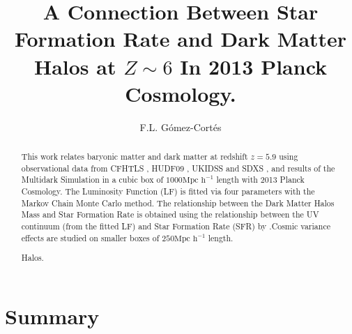 \documentclass[manuscript]{aastex}
\begin{document}
\title{A Connection Between Star Formation Rate and Dark Matter Halos at 
$Z\sim6$ In 2013 Planck Cosmology.}

\author{F.L. G\'omez-Cort\'es }

\begin{abstract}
This work relates baryonic matter and dark matter at redshift $z=5.9$ using 
observational data from CFHTLS \citep{willott13}, HUDF09 
\citep{bouwens06,bouwens12}, UKIDSS and SDXS \citep{mclure09}, and results of 
the Multidark Simulation \citep{riebe13} in a cubic box of $1000 \textrm{Mpc 
h}^{-1}$ length with 2013 Planck Cosmology. The Luminosity Function (LF) is 
fitted via four parameters with the Markov Chain Monte Carlo method. The 
relationship between the Dark Matter Halos Mass and Star Formation Rate is 
obtained using the relationship between the UV  continuum (from the fitted LF) 
and Star Formation Rate (SFR) by \cite{kennicutt98}.Cosmic variance effects are 
studied on smaller boxes of $250 \textrm{Mpc h}^{-1}$ length.

Halos.
\end{abstract}











\section{Summary}


\acknowledgments
%
\appendix



\end{document}
